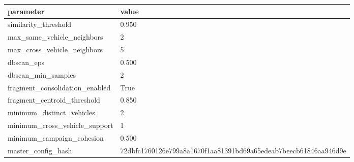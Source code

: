 \begin{tabular}{ll}
\toprule
parameter & value \\
\midrule
similarity_threshold & 0.950 \\
max_same_vehicle_neighbors & 2 \\
max_cross_vehicle_neighbors & 5 \\
dbscan_eps & 0.500 \\
dbscan_min_samples & 2 \\
fragment_consolidation_enabled & True \\
fragment_centroid_threshold & 0.850 \\
minimum_distinct_vehicles & 2 \\
minimum_cross_vehicle_support & 1 \\
minimum_campaign_cohesion & 0.500 \\
master_config_hash & 72dbfc1760126e799a8a1670f1aa81391bd69a65edeab7beecb61846aa946d9e \\
\bottomrule
\end{tabular}
